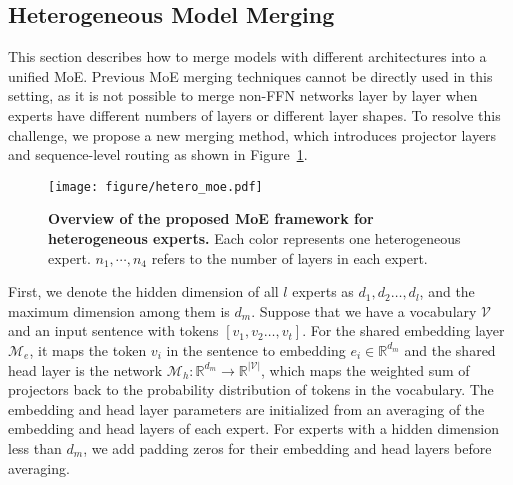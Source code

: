 \subsection{Heterogeneous Model Merging}
\label{sec:merge_with_hetero}
This section describes how to merge models with different architectures into a unified MoE. 
Previous MoE merging techniques cannot be directly used in this setting, as it is not possible to merge non-FFN networks layer by layer when experts have different numbers of layers or different layer shapes. 
To resolve this challenge, we propose a new merging method, which introduces projector layers and sequence-level routing as shown in Figure~\ref{fig:moe_hetero}. 



\begin{figure}[!htb]
     \centering
     \texttt{[image: figure/hetero\_moe.pdf]}
     \caption{\textbf{Overview of the proposed MoE framework for heterogeneous experts.} Each color represents one heterogeneous expert. $n_1, \cdots, n_4$ refers to the number of layers in each expert.}
     \label{fig:moe_hetero}
\end{figure}

First, we denote the hidden dimension of all $l$ experts as $d_1, d_2\dots, d_l$, and the maximum dimension among them is $d_m$. Suppose that we have a vocabulary $\mathcal{V}$ and an input sentence with tokens $[v_1, v_2 \dots, v_t]$. For the shared embedding layer $\mathcal{M}_e$, it maps the token $v_i$ in the sentence to embedding $e_i \in \mathbb{R}^{d_m}$ and the shared head layer is the network $\mathcal{M}_{h}: \mathbb{R}^{d_m} \rightarrow \mathbb{R}^{\vert \mathcal{V} \vert}$, which maps the weighted sum of projectors back to the probability distribution of tokens in the vocabulary. The embedding and head layer parameters are initialized from an averaging of the embedding and head layers of each expert. For experts with a hidden dimension less than $d_m$, we add padding zeros for their embedding and head layers before averaging. 

